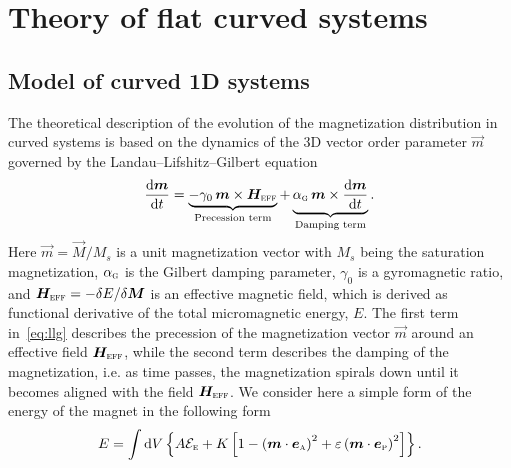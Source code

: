 \section{Theory of flat curved systems}\label{sec:theory_1D}

\subsection{Model of curved 1D systems}\label{sec:model_1D}

The theoretical description of the evolution of the magnetization distribution in curved systems is based on the dynamics of the 3D vector order parameter $\vec{m}$ governed by the Landau--Lifshitz--Gilbert equation~\cite{Landau35,Gilbert04}
\begin{equation}\label{eq:llg}
    \frac{\mathrm{d}\vec{m}}{\mathrm{d}t}=\underbrace{-\gamma_0\, \vec{m}\times\vec{H}_\textsc{eff}}_{\text{Precession term}} + \underbrace{\alpha_\textsc{g}\, \vec{m}\times\frac{\mathrm{d}\vec{m}}{\mathrm{d}t}}_{\text{Damping term}}.
\end{equation}
Here $\vec{m}=\vec{M}/M_s$ is a unit magnetization vector with $M_s$ being the saturation magnetization, $\alpha_\textsc{g}$ is the Gilbert damping parameter, $\gamma_0$ is a gyromagnetic ratio, and $\vec{H}_\textsc{eff}=-\delta E/\delta\vec{M}$ is an effective magnetic field, which is derived as functional derivative of the total micromagnetic energy, $E$. The first term in~\eqref{eq:llg} describes the precession of the magnetization vector $\vec{m}$ around an effective field $\vec{H}_\textsc{eff}$, while the second term describes the damping of the  magnetization, i.e. as time passes, the magnetization spirals down until it becomes aligned with the field $\vec{H}_\textsc{eff}$.  We consider here a simple form of the energy of the magnet in the following form%
\begin{equation}\label{eq:total_energy}
	E=\int\mathrm{d}V\left\{A\mathcal{E}_\textsc{e}+K\left[1-\left(\vec{m}\cdot\vec{e}_\textsc{a}\right)^2+\varepsilon\left(\vec{m}\cdot\vec{e}_\textsc{p}\right)^2\right]\right\}.
\end{equation}
